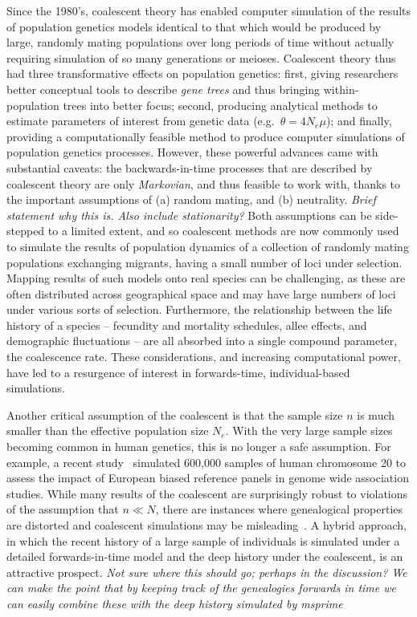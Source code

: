 \documentclass{article}
\newcommand{\plr}[1]{{\em \color{blue} #1}}
\newcommand{\jk}[1]{{\em \color{red} #1}}
\begin{document}
Since the 1980's, coalescent theory has enabled computer simulation of the results of population genetics models
identical to that which would be produced by large, randomly mating populations over long periods of time
without actually requiring simulation of so many generations or meioses.
Coalescent theory thus had three transformative effects on population genetics:
first, giving researchers better conceptual tools to describe \emph{gene trees} and thus bringing within-population trees into better focus;
second, producing analytical methods to estimate parameters of interest from genetic data (e.g.\ $\theta = 4N_e \mu$);
and finally, providing a computationally feasible method to produce computer simulations of population genetics processes.
However, these powerful advances came with substantial caveats:
the backwards-in-time processes that are described by coalescent theory
are only \emph{Markovian}, and thus feasible to work with,
thanks to the important assumptions of (a) random mating, and (b) neutrality.
\plr{Brief statement why this is.  Also include stationarity?}
Both assumptions can be side-stepped to a limited extent, and so coalescent methods are now commonly used to
simulate the results of population dynamics of a collection of randomly mating populations exchanging migrants,
having a small number of loci under selection.
Mapping results of such models onto real species can be challenging,
as these are often distributed across geographical space and may have large numbers of loci under various sorts of selection.
Furthermore, the relationship between the life history of a species --
fecundity and mortality schedules, allee effects, and demographic fluctuations --
are all absorbed into a single compound parameter, the coalescence rate.
These considerations, and increasing computational power, have led to a resurgence of interest in forwards-time, individual-based simulations.

Another critical assumption of the coalescent is that the sample size $n$ is much smaller
than the effective population size $N_e$. With the very large sample sizes becoming common
in human genetics, this is no longer a safe assumption. For example, a recent study~\citep{martin2017human}
simulated 600,000 samples of human chromosome 20 to assess the impact of European biased
reference panels in genome wide association studies. While many results of the
coalescent are surprisingly
robust to violations of the assumption that $n \ll N$, there are instances where genealogical properties
are distorted and coalescent simulations may be
misleading~\citep{wakeley2003gene,maruvka2011recovering,bhaskar2014distortion}.
A hybrid approach, in which the recent history of a large sample of
individuals is simulated under a detailed forwards-in-time model and the deep history
under the coalescent, is an attractive prospect.
\jk{Not sure where this should go; perhaps in the discussion? We can make the point that
by keeping track of the genealogies forwards in time we can easily combine these with the
deep history simulated by msprime}
\end{document}

